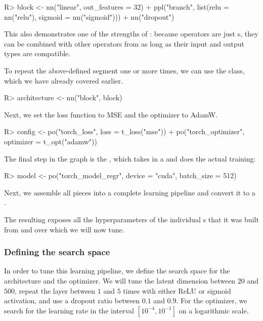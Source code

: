 \documentclass[article]{jss}
\theoremstyle{definition}
\begin{document}
\begin{CodeInput}
R> block <- nn("linear", out_features = 32) %
+    ppl("branch", list(relu = nn("relu"), sigmoid = nn("sigmoid"))) %
+    nn("dropout")
\end{CodeInput}

This also demonstrates one of the strengths of : because  operators are just s, they can be combined with other operators from  as long as their input and output types are compatible.

To repeat the above-defined segment one or more times, we can use the  class, which we have already covered earlier.

\begin{CodeInput}
R> architecture <- nn("block", block) %
\end{CodeInput}

Next, we set the loss function to MSE and the optimizer to AdamW.

\begin{CodeInput}
R> config <- po("torch_loss", loss = t_loss("mse")) %
+    po("torch_optimizer", optimizer = t_opt("adamw"))
\end{CodeInput}

The final step in the graph is the , which takes in a  and does the actual training:

\begin{CodeInput}
R> model <- po("torch_model_regr", device = "cuda", batch_size = 512)
\end{CodeInput}

Next, we assemble all pieces into a complete learning pipeline and convert it to a .


The resulting  exposes all the hyperparameters of the individual s that it was built from and over which we will now tune.

\subsubsection{Defining the search space}
In order to tune this learning pipeline, we define the search space for the architecture and the optimizer.
We will tune the latent dimension between $20$ and $500$, repeat the layer between $1$ and $5$ times with either ReLU or sigmoid activation, and use a dropout ratio between $0.1$ and $0.9$.
For the optimizer, we search for the learning rate in the interval $[10^{-4}, 10^{-1}]$ on a logarithmic scale.
\end{document}

